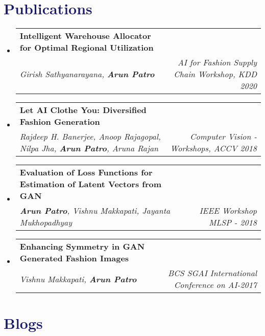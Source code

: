\documentclass[letterpaper,10.7pt]{article}
\makeatletter
\newcommand{\resumeItem}[1]{
  \item\small{
    {#1 \vspace{-2pt}}
  }
}
\newcommand{\resumeSubheading}[4]{
  \vspace{-2pt}\item
    \begin{tabular*}{1.0\textwidth}[t]{l@{\extracolsep{\fill}}r}
      \textbf{#1} & \textbf{\small #2} \\
      \textit{\small#3} & \textit{\small #4} \\
    \end{tabular*}\vspace{-7pt}
}
\newcommand{\resumeSubHeadingListStart}{\begin{itemize}[leftmargin=0.0in, label={}]}
\newcommand{\resumeSubHeadingListEnd}{\end{itemize}}
\newcommand{\resumeItemListStart}{\begin{itemize}}
\newcommand{\resumeItemListEnd}{\end{itemize}\vspace{-5pt}}
\makeatother
\begin{document}
\section{\textcolor{MidnightBlue}{Publications}}
\resumeSubHeadingListStart

 
\resumeSubheading
{Intelligent Warehouse Allocator for Optimal Regional Utilization \href{https://arxiv.org/abs/2007.05081}{\color{blue}{[arxiv]}}}{}
{Girish Sathyanarayana, \textbf{Arun Patro}}{AI for Fashion Supply Chain Workshop, KDD 2020}

\resumeSubheading
{Let AI Clothe You: Diversified Fashion Generation \href{https://doi.org/10.1007/978-3-030-21074-8_7}{\color{blue}{[link]}}}{}
{Rajdeep H. Banerjee, Anoop Rajagopal, Nilpa Jha, \textbf{Arun Patro}, Aruna Rajan}{Computer Vision - Workshops, ACCV 2018}

\resumeSubheading
{Evaluation of Loss Functions for Estimation of Latent Vectors from GAN \href{https://ieeexplore.ieee.org/abstract/document/8517097}{\color{blue}{[link]}}}{}
{\textbf{Arun Patro}, Vishnu Makkapati, Jayanta Mukhopadhyay}{IEEE Workshop MLSP - 2018}

\resumeSubheading
{Enhancing Symmetry in GAN Generated Fashion Images \href{https://doi.org/10.1007/978-3-319-71078-5_34}{\color{blue}{[link]}}}{}
{Vishnu Makkapati, \textbf{Arun Patro}}{BCS SGAI International Conference on AI-2017}

\resumeSubHeadingListEnd

\section{\textcolor{MidnightBlue}{Blogs}}
\end{document}
